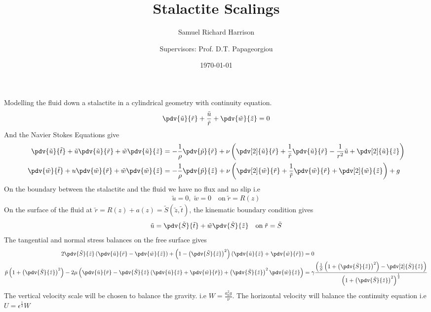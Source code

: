 \documentclass[12pt]{article}
\title{Stalactite Scalings}
\author[1,2]{Samuel Richard Harrison}
\author[2]{\authorcr Supervisors: Prof. D.T. Papageorgiou}
\affil[1]{ University of Reading}
\affil[2]{Imperial College London}
\date{\today}
\newcommand{\rt}{^{\frac{1}{2}}}
\begin{document}
	Modelling the fluid down a stalactite in a cylindrical geometry with continuity equation.
\begin{align}
\pdv{\tilde u}{\tilde r}+\frac{\tilde u}{\tilde r}+\pdv{\tilde w}{\tilde z}=0 \label{continuity}
\end{align}
And the Navier Stokes Equations give
\begin{align}
\pdv{\tilde u}{\tilde t}+\tilde u\pdv{\tilde u}{\tilde r}+\tilde w\pdv{\tilde u}{\tilde z}&=-\frac{1}{\rho}\pdv{\tilde p}{\tilde r}+\nu\left(\pdv[2]{\tilde u}{\tilde r}+\frac{1}{\tilde r}\pdv{\tilde u}{\tilde r}-\frac{1}{r^2}\tilde u+\pdv[2]{\tilde u}{\tilde z}\right)\label{navierr}\\
\pdv{\tilde w}{\tilde t}+u\pdv{\tilde w}{\tilde r}+\tilde w\pdv{\tilde w}{\tilde z}&=-\frac{1}{\rho}\pdv{\tilde p}{\tilde z}+\nu\left(\pdv[2]{\tilde w}{\tilde r}+\frac{1}{\tilde r}\pdv{\tilde w}{\tilde r}+\pdv[2]{\tilde w}{\tilde z}\right) + g \label{navierv}
\end{align}
On the boundary between the stalactite and the fluid we have no flux and no slip i.e
\begin{align}
\tilde u=0,\;\tilde  w=0\quad\mathrm{on}\; \tilde r=R(z) \label{solidboundary}
\end{align}
On the surface of the fluid at $\tilde r=R(z)+a(z)=\tilde S(\tilde z,\tilde t)$, the kinematic boundary condition gives
\begin{align}
\tilde   u=\pdv{\tilde S}{\tilde t}+\tilde w\pdv{\tilde S}{\tilde z} \quad\mathrm{on}\;\tilde  r=\tilde S \label{kinematic}
\end{align}
The tangential and normal stress balances on the free surface gives
\footnotesize
\begin{align}
2\pdv{\tilde S}{\tilde z}\left(\pdv{\tilde u}{\tilde r}-\pdv{\tilde w}{\tilde z}\right)+\left(1-\left(\pdv{\tilde S}{\tilde z}\right)^2\right)\left(\pdv{\tilde u}{\tilde z}+\pdv{\tilde w}{\tilde r}\right)&=0\label{tangstress}\\
\tilde p\left(1+\left(\pdv{\tilde S}{\tilde z}\right)^2\right)-2\mu\left( \pdv{\tilde u}{\tilde r}-\pdv{\tilde S}{\tilde z}\left(\pdv{\tilde u}{\tilde z}+\pdv{\tilde w}{\tilde r}\right)+\left(\pdv{\tilde S}{\tilde z}\right)^2\pdv{\tilde w}{\tilde z}\right)&=\gamma\frac{\left(\frac{1}{\tilde S}\left(1+\left(\pdv{\tilde S}{\tilde z}\right)^2\right)-\pdv[2]{\tilde S}{\tilde z}\right)}{\left(1+\left(\pdv{\tilde S}{\tilde z}\right)^2\right)^{\frac{1}{2}}}\label{normstress}
\end{align}
\normalsize
The vertical velocity scale will be chosen to balance the gravity. i.e $W = \frac{a_0^2g}{\nu}$. The horizontal velocity will balance the continuity equation i.e $U  =\epsilon\rt W$
\end{document}
